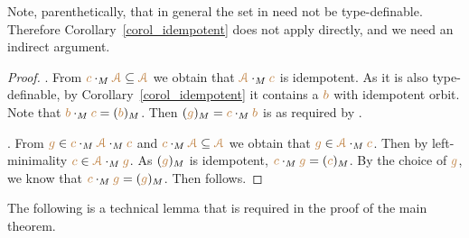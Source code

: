 Note, parenthetically, that in general the set in  need not be type-definable.
Therefore Corollary~\ref{corol_idempotent} does not apply directly, and we need an indirect argument.

\begin{proof}.  
From ${\color{brown} c}\cdot_M{\color{brown}\EuScript A}\subseteq{\color{brown}\EuScript A}$ we obtain that ${\color{brown}\EuScript A}\cdot_M{\color{brown} c}$ is idempotent.
As it is  also type-definable, by Corollary~\ref{corol_idempotent} it contains a ${\color{brown} b}$ with idempotent orbit.
Note that ${\color{brown} b}\cdot_M{\color{brown} c}=({\color{brown} b})_M$.
Then $({\color{brown} g})_M={\color{brown} c}\cdot_M{\color{brown} b}$ is as required by .

. From ${\color{brown} g}\in{\color{brown}c}\cdot_M{\color{brown}\EuScript A}\cdot_M{\color{brown} c}$ and ${\color{brown} c}\cdot_M{\color{brown}\EuScript A}\subseteq{\color{brown}\EuScript A}$ we obtain that ${\color{brown} g}\in{\color{brown}\EuScript A}\cdot_M{\color{brown} c}$.
Then by left-minimality ${\color{brown} c}\in{\color{brown}\EuScript A}\cdot_M{\color{brown} g}$.
As $({\color{brown} g})_M$ is idempotent, ${\color{brown} c}\cdot_M{\color{brown} g}=({\color{brown} c})_M$.
By the choice of ${\color{brown} g}$, we know that ${\color{brown} c}\cdot_M{\color{brown} g}=({\color{brown} g})_M$.
Then  follows.
\end{proof}

The following is a technical lemma that is required in the proof of the main theorem.


